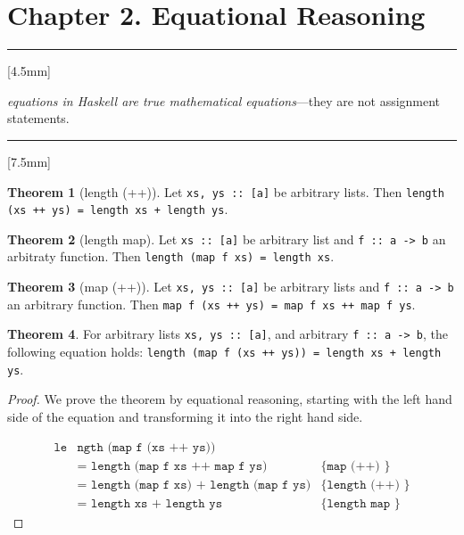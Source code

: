 \documentclass[11pt,a4paper]{article}
\theoremstyle{definition}
\newtheorem{thm}{Theorem}
\begin{document}
\section*{Chapter 2. Equational Reasoning}


\vspace{5mm}\rule{\textwidth}{0.1pt}\vspace{5mm}
[4.5mm]

\emph{equations in Haskell are true mathematical equations}---they are not
assignment statements.


\vspace{5mm}\rule{\textwidth}{0.1pt}
[7.5mm]

\begin{thm}[length (++)]
  Let \texttt{xs, ys :: [a]} be arbitrary lists.
  Then \texttt{length (xs ++ ys) = length xs + length ys}.
\end{thm}

\begin{thm}[length map]
  Let \texttt{xs :: [a]} be arbitrary list and \texttt{f :: a -> b} an
  arbitraty function. Then \texttt{length (map f xs) = length xs}.
\end{thm}

\begin{thm}[map (++)]
  Let \texttt{xs, ys :: [a]} be arbitrary lists and \texttt{f :: a -> b} an
  arbitrary function. Then \texttt{map f (xs ++ ys) = map f xs ++ map f ys}.
\end{thm}

\begin{thm}
  For arbitrary lists \texttt{xs, ys :: [a]},
  and arbitrary \texttt{f :: a -> b},  the following equation holds:
  \texttt{length (map f (xs ++ ys)) = length xs + length ys}.
\end{thm}

\begin{proof}
  We prove the theorem by equational reasoning, starting with the left hand side
  of the equation and transforming it into the right hand side.

  \begin{align*}
    \texttt{le}&\texttt{ngth (map f (xs ++ ys))}                           \\
      &\texttt{= length (map f xs ++ map f ys)}  & \texttt{\{ map (++) \}} \\
      &\texttt{= length (map f xs) + length (map f ys)}  & \texttt{\{ length (++) \}} \\
      &\texttt{= length xs + length ys}  & \texttt{\{ length map \}}
  \end{align*}
\end{proof}
\end{document}
